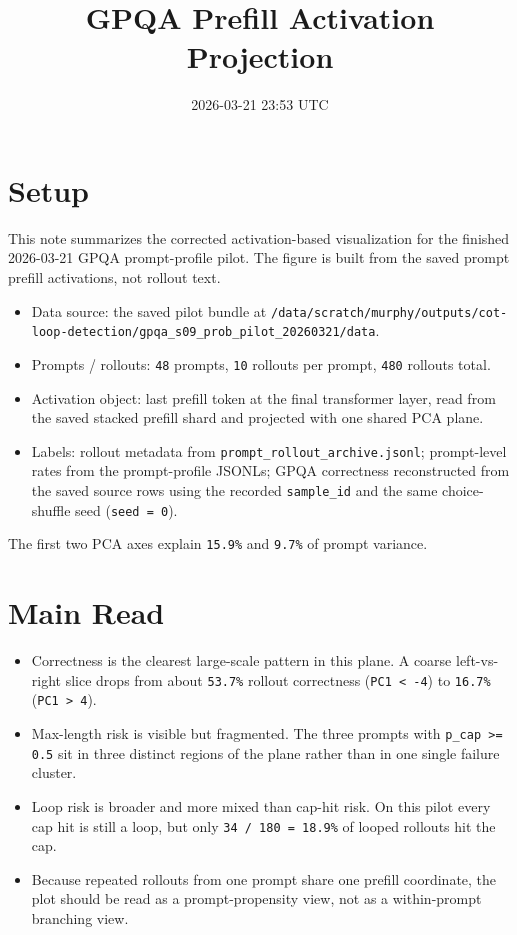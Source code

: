\documentclass[11pt]{article}
\title{GPQA Prefill Activation Projection}
\author{}
\date{2026-03-21 23:53 UTC}
\begin{document}
\maketitle

\section*{Setup}
This note summarizes the corrected activation-based visualization for the finished
2026-03-21 GPQA prompt-profile pilot. The figure is built from the saved prompt
prefill activations, not rollout text.

\begin{itemize}[leftmargin=1.5em]
\item Data source: the saved pilot bundle at
\texttt{/data/scratch/murphy/outputs/cot-loop-detection/gpqa\_s09\_prob\_pilot\_20260321/data}.
\item Prompts / rollouts: \texttt{48} prompts, \texttt{10} rollouts per prompt,
\texttt{480} rollouts total.
\item Activation object: last prefill token at the final transformer layer,
read from the saved stacked prefill shard and projected with one shared PCA plane.
\item Labels: rollout metadata from \texttt{prompt\_rollout\_archive.jsonl};
prompt-level rates from the prompt-profile JSONLs; GPQA correctness reconstructed
from the saved source rows using the recorded \texttt{sample\_id} and the same
choice-shuffle seed (\texttt{seed = 0}).
\end{itemize}

The first two PCA axes explain \texttt{15.9\%} and \texttt{9.7\%} of prompt
variance.

\section*{Main Read}
\begin{itemize}[leftmargin=1.5em]
\item Correctness is the clearest large-scale pattern in this plane. A coarse
left-vs-right slice drops from about \texttt{53.7\%} rollout correctness
(\texttt{PC1 < -4}) to \texttt{16.7\%} (\texttt{PC1 > 4}).
\item Max-length risk is visible but fragmented. The three prompts with
\texttt{p\_cap >= 0.5} sit in three distinct regions of the plane rather than in
one single failure cluster.
\item Loop risk is broader and more mixed than cap-hit risk. On this pilot every
cap hit is still a loop, but only \texttt{34 / 180 = 18.9\%} of looped rollouts
hit the cap.
\item Because repeated rollouts from one prompt share one prefill coordinate, the
plot should be read as a prompt-propensity view, not as a within-prompt branching
view.
\end{itemize}
\end{document}
